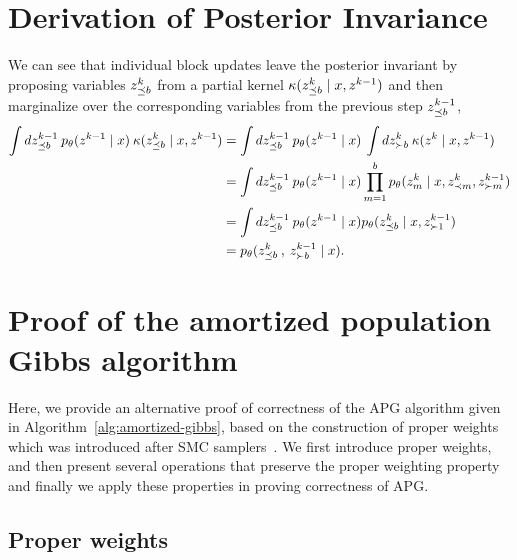 \documentclass{article}
\theoremstyle{definition}
\begin{document}
\section{ Derivation of Posterior Invariance}
\label{appendix:posterior-invariance}
We can see that individual block updates leave the posterior invariant by proposing variables $z^k_{\preceq b}$ from a partial kernel $\kappa(z^k_{\preceq b} \mid x, z^{k-1})$ and then marginalize over the corresponding variables from the previous step $z^{k-1}_{\preceq b}$,
\begin{align*}
    \int 
    dz^{k-1}_{\preceq b} 
    \:
    p_\theta(z^{k-1} \mid x) 
    \: 
    \kappa(z^k_{\preceq b} \mid x, z^{k-1}) 
    &=
    \int 
    dz^{k-1}_{\preceq b} 
    \:
    p_\theta(z^{k-1} \mid x) 
    \: 
    \int dz^k_{\succ b}
    \:
    \kappa(z^k \mid x, z^{k-1})
    \\
    &= 
    \int 
    dz^{k-1}_{\preceq b} 
    \: 
    p_\theta(z^{k-1} \mid x)
    \prod_{m=1}^b p_\theta(z^k_m \mid x, z^{k}_{\prec m}, z^{k-1}_{\succ m})
    \\
    &=
    \int 
    dz^{k-1}_{\preceq b} 
    \: 
    p_\theta(z^{k-1} \mid x)
    p_\theta(z^k_{\preceq b} \mid x, z^{k-1}_{\succ 1})
    \\
    &=
    p_\theta(z^k_{\preceq b}\:, \: z^{k-1}_{\succ b} \mid x)
    .
\end{align*}

\section{Proof of the amortized population Gibbs algorithm}
\label{appendix:proof-algo}

Here, we provide an alternative proof of correctness of the APG algorithm given in Algorithm~\ref{alg:amortized-gibbs}, based on the construction of proper weights~\cite{naesseth2015nested} which was introduced after SMC samplers~\cite{delmoral2006sequential}.
We first introduce proper weights, and then present several operations that preserve the proper weighting property and finally we apply these properties in proving correctness of APG.

\subsection{Proper weights}
\end{document}

